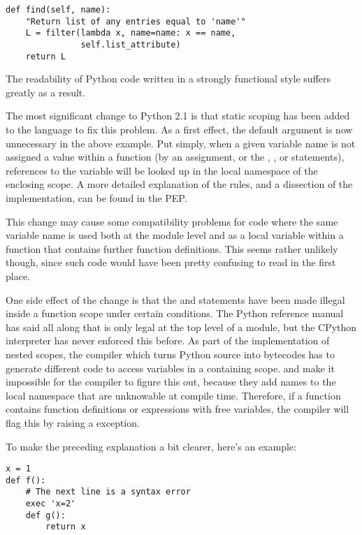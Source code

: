 \documentclass{howto}
\begin{document}
\begin{verbatim}
def find(self, name):
    "Return list of any entries equal to 'name'"
    L = filter(lambda x, name=name: x == name,
               self.list_attribute)
    return L
\end{verbatim}

The readability of Python code written in a strongly functional style
suffers greatly as a result.

The most significant change to Python 2.1 is that static scoping has
been added to the language to fix this problem.  As a first effect,
the  default argument is now unnecessary in the above
example.  Put simply, when a given variable name is not assigned a
value within a function (by an assignment, or the ,
, or  statements), references to the
variable will be looked up in the local namespace of the enclosing
scope.  A more detailed explanation of the rules, and a dissection of
the implementation, can be found in the PEP.

This change may cause some compatibility problems for code where the
same variable name is used both at the module level and as a local
variable within a function that contains further function definitions.
This seems rather unlikely though, since such code would have been
pretty confusing to read in the first place.  

One side effect of the change is that the  and  statements have been made illegal inside
a function scope under certain conditions.  The Python reference
manual has said all along that  is
only legal at the top level of a module, but the CPython interpreter
has never enforced this before.  As part of the implementation of
nested scopes, the compiler which turns Python source into bytecodes
has to generate different code to access variables in a containing
scope.   and  make it
impossible for the compiler to figure this out, because they add names
to the local namespace that are unknowable at compile time.
Therefore, if a function contains function definitions or
 expressions with free variables, the compiler will
flag this by raising a  exception.

To make the preceding explanation a bit clearer, here's an example:

\begin{verbatim}
x = 1
def f():
    # The next line is a syntax error
    exec 'x=2'  
    def g():
        return x
\end{verbatim}
\end{document}
